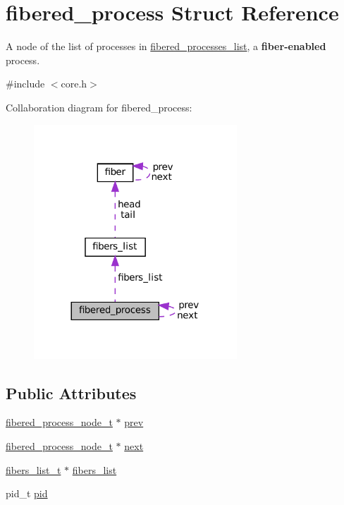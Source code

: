 \hypertarget{structfibered__process}{}\section{fibered\+\_\+process Struct Reference}
\label{structfibered__process}


A node of the list of processes in \mbox{\hyperlink{structfibered__processes__list}{fibered\+\_\+processes\+\_\+list}}, a {\bfseries fiber-\/enabled} process.  




{\ttfamily \#include $<$core.\+h$>$}



Collaboration diagram for fibered\+\_\+process\+:
\nopagebreak
\begin{figure}[H]
\begin{center}
\leavevmode
\includegraphics[width=216pt]{structfibered__process__coll__graph}
\end{center}
\end{figure}
\subsection*{Public Attributes}
\begin{DoxyCompactItemize}
\item 
\mbox{\hyperlink{core_8h_aa16708c717e33e5e95614cd1e4ca7b2b}{fibered\+\_\+process\+\_\+node\+\_\+t}} $\ast$ \mbox{\hyperlink{structfibered__process_adf5ba8614f416e75bc026fe449fdd08c}{prev}}
\item 
\mbox{\hyperlink{core_8h_aa16708c717e33e5e95614cd1e4ca7b2b}{fibered\+\_\+process\+\_\+node\+\_\+t}} $\ast$ \mbox{\hyperlink{structfibered__process_a8779fb1384900987ccd2d0d9de09a1ab}{next}}
\item 
\mbox{\hyperlink{core_8h_aad42420053a7ace7b3fb17805d6e9004}{fibers\+\_\+list\+\_\+t}} $\ast$ \mbox{\hyperlink{structfibered__process_a1aae0be425bbc05b6444909f16ec56b9}{fibers\+\_\+list}}
\item 
pid\+\_\+t \mbox{\hyperlink{structfibered__process_ad8f9adb6ee521988f3607ccf279e10a6}{pid}}
\end{DoxyCompactItemize}


